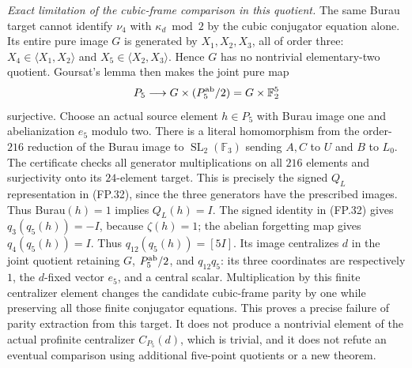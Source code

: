 \emph{Exact limitation of the cubic-frame comparison in this quotient.}
The same Burau target cannot identify $\nu_4$ with
$\kappa_d\bmod2$ by the cubic conjugator equation alone.
Its entire pure image $G$ is generated by $X_1,X_2,X_3$, all
of order three: $X_4\in\langle X_1,X_2\rangle$ and
$X_5\in\langle X_2,X_3\rangle$. Hence $G$ has no
nontrivial elementary-two quotient. Goursat's lemma then makes
the joint pure map
\[
            P_5\longrightarrow G\times(P_5^{\rm ab}/2)
                              =G\times\mathbb F_2^5
\]
surjective. Choose an actual source element $h\in P_5$ with
Burau image one and abelianization $e_5$ modulo two.
There is a literal homomorphism from the order-$216$ reduction
of the Burau image to $\operatorname{SL}_2(\mathbb F_3)$
sending $A,C$ to $U$ and $B$ to $L_0$. The certificate checks
all generator multiplications on all $216$ elements and
surjectivity onto its $24$-element target. This is precisely
the signed $Q_L$ representation in (FP.32), since the three
generators have the prescribed images. Thus Burau$(h)=1$
implies $Q_L(h)=I$. The signed identity in (FP.32) gives
$q_3(q_5(h))=-I$, because $\zeta(h)=1$;
the abelian forgetting map gives $q_4(q_5(h))=I$.
Thus $q_{12}(q_5(h))=[5I]$.
Its image centralizes $d$ in the joint quotient retaining
$G$, $P_5^{\rm ab}/2$, and $q_{12}q_5$: its three coordinates
are respectively $1$, the $d$-fixed vector $e_5$, and a central
scalar. Multiplication by this finite centralizer element
changes the candidate cubic-frame parity by one while preserving
all those finite conjugator equations. This proves a precise
failure of parity extraction from this target. It does not
produce a nontrivial element of the actual profinite centralizer
$C_{P_5}(d)$, which is trivial, and it does not refute an eventual
comparison using additional five-point quotients or a new theorem.

